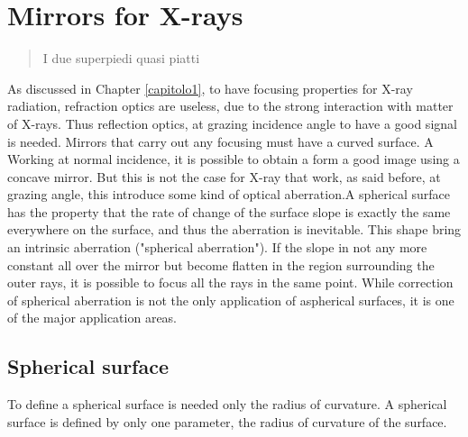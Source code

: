 \chapter{Mirrors for X-rays}
\label{capitolo2}
\thispagestyle{empty}

\begin{quotation}
{\footnotesize
{}
\begin{flushright}
I due superpiedi quasi piatti
\end{flushright}
}
\end{quotation}
\vspace{0.5cm}

\noindent As discussed in Chapter \ref{capitolo1}, to have focusing properties for X-ray radiation, refraction optics are useless, due to the strong interaction with matter of X-rays. Thus reflection optics, at grazing incidence angle to have a good signal is needed. Mirrors that carry out any focusing must have a curved surface. A Working at normal incidence, it is possible to obtain a form a good image using a concave mirror. But this is not the case for X-ray that work, as said before, at grazing angle, this introduce some kind of optical aberration.A spherical surface has the property that the rate of change of the surface slope is exactly the same everywhere on the surface, and thus the aberration is inevitable. This shape bring an intrinsic aberration ("spherical aberration").
If the slope in not any more constant all over the mirror but become flatten in the region surrounding the outer rays, it is possible to focus all the rays in the same point. While correction of spherical aberration is not the only application of aspherical surfaces, it is one of the major application areas.

\section{Spherical surface}
\noindent To define a spherical surface is needed only the radius of curvature.  A spherical surface is defined by only one parameter, the radius of curvature of the surface. 
